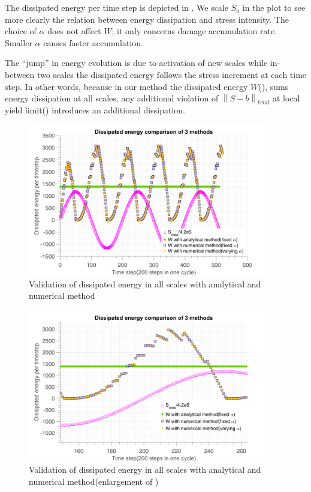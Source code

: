The dissipated energy per time step is depicted in . We scale $S_{a}$ in the plot to see more clearly the relation between energy dissipation and stress intensity. The choice of $\alpha$ does not affect $W$; it only concerns damage accumulation rate. Smaller $\alpha$ causes faster accumulation.

The ``jump'' in energy evolution is due to activation of new scales while in-between two scales the dissipated energy follows the stress increment at each time step. In other words, because in our method the dissipated energy $W$(), sums energy dissipation at all scales, any additional violation of $\left\|S-b \right\|_{trial}$ at local yield limit() introduces an additional dissipation. 

\begin{figure}[!h]
\centering
\includegraphics[width=0.95\textwidth]{figures//W_3methods.png} 
\caption{Validation of dissipated energy in all scales with analytical and numerical method }
\label{fig.W3methods}
\end{figure}
\begin{figure}[!h]
	\centering
	\includegraphics[width=0.95\textwidth]{figures//W_3methods_enlarge.png} 
	\caption{Validation of dissipated energy in all scales with analytical and numerical method(enlargement of )}
	\label{fig.W3methodsenlarge}
\end{figure}
